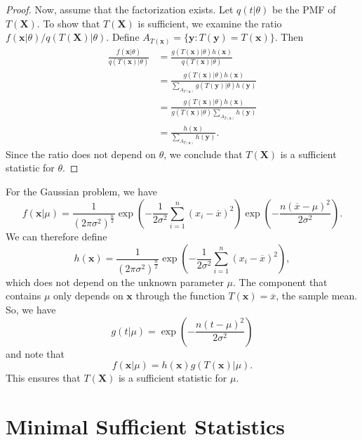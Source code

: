 \begin{proof}
Now, assume that the factorization exists.
Let $q(t|\theta)$ be the PMF of $T(\mathbf{X})$.
To show that $T(\mathbf{X})$ is sufficient, we examine the ratio $f(\mathbf{x}|\theta)/q(T(\mathbf{X})|\theta)$.
Define $A_{T(\mathbf{x})} = \{ \mathbf{y} : T(\mathbf{y}) = T(\mathbf{x}) \}$.
Then
\begin{equation*}
\begin{split}
\frac{ f(\mathbf{x}|\theta) }{ q(T(\mathbf{x})|\theta) }
&= \frac{ g(T(\mathbf{x})|\theta) h(\mathbf{x}) }{ q(T(\mathbf{x})|\theta) } \\
&= \frac{ g(T(\mathbf{x})|\theta) h(\mathbf{x}) }{ \sum_{A_{T(\mathbf{x})}} g(T(\mathbf{y})|\theta) h(\mathbf{y}) } \\
&= \frac{ g(T(\mathbf{x})|\theta) h(\mathbf{x}) }{ g(T(\mathbf{x})|\theta) \sum_{A_{T(\mathbf{x})}} h(\mathbf{y}) } \\
&= \frac{ h(\mathbf{x}) }{ \sum_{A_{T(\mathbf{x})}} h(\mathbf{y}) } .
\end{split}
\end{equation*}
Since the ratio does not depend on $\theta$, we conclude that $T(\mathbf{X})$ is a sufficient statistic for $\theta$.
\end{proof}

For the Gaussian problem, we have
\begin{equation*}
f(\mathbf{x}|\mu) = \frac{1}{(2 \pi \sigma^2)^{\frac{n}{2}}}
\exp \left( - \frac{1}{2 \sigma^2} \sum_{i=1}^n (x_i - \overline{x})^2 \right)
\exp \left( - \frac{n (\overline{x} - \mu)^2 }{2 \sigma^2} \right) .
\end{equation*}
We can therefore define
\begin{equation*}
h(\mathbf{x}) = \frac{1}{(2 \pi \sigma^2)^{\frac{n}{2}}}
\exp \left( - \frac{1}{2 \sigma^2} \sum_{i=1}^n (x_i - \overline{x})^2 \right) ,
\end{equation*}
which does not depend on the unknown parameter $\mu$.
The component that contains $\mu$ only depends on $\mathbf{x}$ through the function $T(\mathbf{x}) = \overline{x}$, the sample mean.
So, we have
\begin{equation*}
g(t|\mu) = \exp \left( - \frac{n (t - \mu)^2 }{2 \sigma^2} \right)
\end{equation*}
and note that
\begin{equation*}
f(\mathbf{x}|\mu) = h(\mathbf{x}) g(T(\mathbf{x})|\mu) .
\end{equation*}
This ensures that $T(\mathbf{X})$ is a sufficient statistic for $\mu$.


\section{Minimal Sufficient Statistics}

